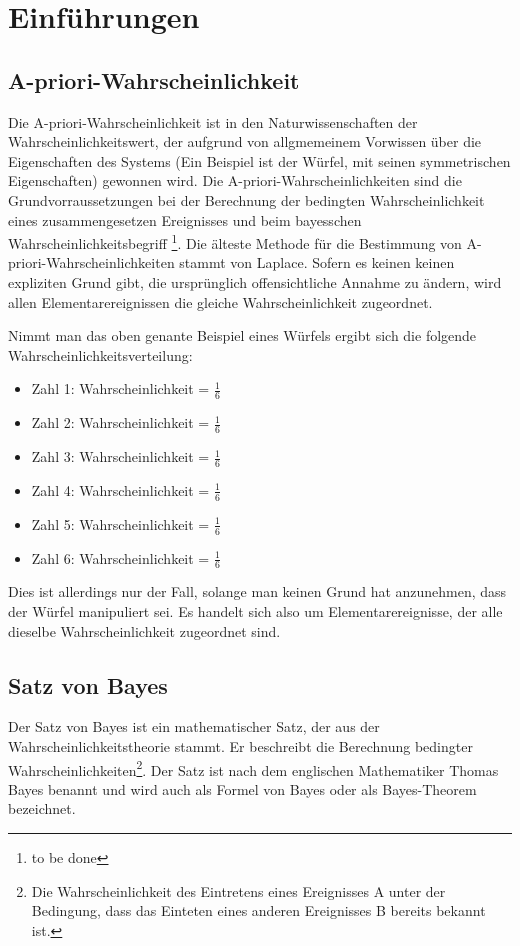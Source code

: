 \chapter{Einführungen}

\section{A-priori-Wahrscheinlichkeit}

Die A-priori-Wahrscheinlichkeit ist in den Naturwissenschaften der Wahrscheinlichkeitswert, der aufgrund von allgmemeinem Vorwissen über die Eigenschaften des Systems
(Ein Beispiel ist der Würfel, mit seinen symmetrischen Eigenschaften) gewonnen wird. Die A-priori-Wahrscheinlichkeiten sind die Grundvorraussetzungen
bei der Berechnung der bedingten Wahrscheinlichkeit eines zusammengesetzen Ereignisses und beim bayesschen Wahrscheinlichkeitsbegriff \footnote{to be done}.
Die älteste Methode für die Bestimmung von A-priori-Wahrscheinlichkeiten stammt von Laplace. Sofern es keinen keinen expliziten Grund gibt, die ursprünglich
offensichtliche Annahme zu ändern, wird allen Elementarereignissen die gleiche Wahrscheinlichkeit zugeordnet. \cite[S. 80f]{Pap:1995}

Nimmt man das oben genante Beispiel eines Würfels ergibt sich die folgende Wahrscheinlichkeitsverteilung:

\begin{itemize}
    \item Zahl 1: Wahrscheinlichkeit = $\frac{1}{6}$
    \item Zahl 2: Wahrscheinlichkeit = $\frac{1}{6}$
    \item Zahl 3: Wahrscheinlichkeit = $\frac{1}{6}$
    \item Zahl 4: Wahrscheinlichkeit = $\frac{1}{6}$
    \item Zahl 5: Wahrscheinlichkeit = $\frac{1}{6}$
    \item Zahl 6: Wahrscheinlichkeit = $\frac{1}{6}$
\end{itemize}

Dies ist allerdings nur der Fall, solange man keinen Grund hat anzunehmen, dass der Würfel manipuliert sei. Es handelt sich also um Elementarereignisse, der
alle dieselbe Wahrscheinlichkeit zugeordnet sind.

\section{Satz von Bayes}

Der Satz von Bayes ist ein mathematischer Satz, der aus der Wahrscheinlichkeitstheorie stammt. Er beschreibt die Berechnung bedingter
Wahrscheinlichkeiten\footnote{Die Wahrscheinlichkeit des Eintretens eines Ereignisses A unter der Bedingung, dass das Einteten eines anderen Ereignisses B bereits bekannt ist.}.
Der Satz ist nach dem englischen Mathematiker Thomas Bayes benannt und wird auch als Formel von Bayes oder als Bayes-Theorem bezeichnet. \cite[S.411f]{Papula:2014}

